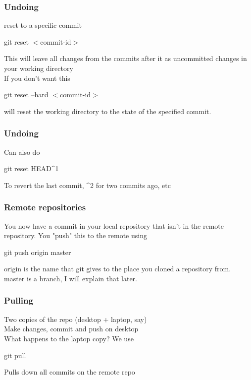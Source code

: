 \documentclass[xcolor=dvipsnames]{beamer}
\begin{document}
\begin{frame}
    \frametitle{Undoing}

    reset to a specific commit
    \begin{block}{}
        git reset $<$commit-id$>$
    \end{block}

    This will leave all changes from the commits after it as uncommitted changes in your working directory\\
    If you don't want this
    \begin{block}{}
        git reset --hard $<$commit-id$>$
    \end{block}
    will reset the working directory to the state of the specified commit.
\end{frame}

\begin{frame}
    \frametitle{Undoing}

    Can also do
    \begin{block}{}
        git reset HEAD\^{}1
    \end{block}

    To revert the last commit, \^{}2 for two commits ago, etc
\end{frame}

\begin{frame}
    \frametitle{Remote repositories}

    You now have a commit in your local repository that isn't in the remote repository.
    You "push" this to the remote using
    \begin{block}{}
        git push origin master
    \end{block}
    
    origin is the name that git gives to the place you cloned a repository from.\\
    master is a branch, I will explain that later.

\end{frame}

\begin{frame}
    \frametitle{Pulling}

    Two copies of the repo (desktop + laptop, say)\\
    Make changes, commit and push on desktop\\\vbox{}
    What happens to the laptop copy? We use
    \begin{block}{}
        git pull
    \end{block}
    Pulls down all commits on the remote repo
\end{frame}
\end{document}
